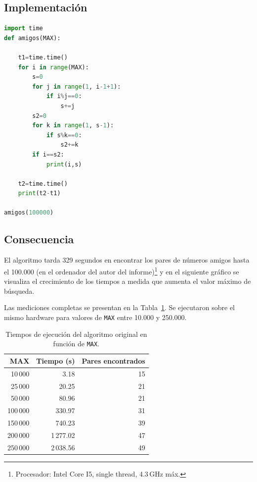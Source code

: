         \subsection{Implementación}
            \begin{lstlisting}[language=Python]
import time
def amigos(MAX):

    t1=time.time()
    for i in range(MAX):
        s=0
        for j in range(1, i-1+1):
            if i%j==0:
                s+=j
        s2=0
        for k in range(1, s-1):
            if s%k==0:
                s2+=k
        if i==s2:
            print(i,s)

    t2=time.time()
    print(t2-t1)

amigos(100000)
            \end{lstlisting}

        \subsection{Consecuencia}
            El algoritmo tarda 329 segundos en encontrar los pares de números amigos hasta el
            100.000 (en el ordenador del autor del
            informe)\footnote{Procesador: Intel Core I5, single thread, 4.3\,GHz máx.}
            y en el siguiente gráfico se visualiza el crecimiento de los tiempos a medida que
            aumenta el valor máximo de búsqueda.

            Las mediciones completas se presentan en la Tabla~\ref{tab:algoritmo_original}.
            Se ejecutaron sobre el mismo hardware para valores de \texttt{MAX} entre 10.000
            y 250.000.

            \begin{table}[htbp]
            \centering
            \begin{tabular}{|r|r|r|}
            \hline
            \textbf{MAX} & \textbf{Tiempo (s)} & \textbf{Pares encontrados} \\
            \hline
             10\,000 &     3.18 & 15 \\
             25\,000 &    20.25 & 21 \\
             50\,000 &    80.96 & 21 \\
            100\,000 &   330.97 & 31 \\
            150\,000 &   740.23 & 39 \\
            200\,000 & 1\,277.02 & 47 \\
            250\,000 & 2\,038.56 & 49 \\
            \hline
            \end{tabular}
            \caption{Tiempos de ejecución del algoritmo original en función de \texttt{MAX}.}
            \label{tab:algoritmo_original}
            \end{table}

